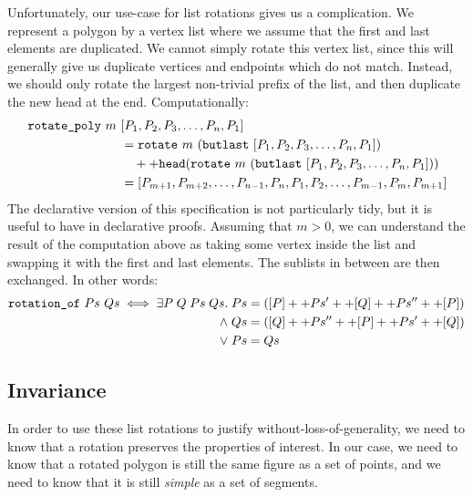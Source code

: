 Unfortunately, our use-case for list rotations gives us a complication. We represent a polygon by a vertex list where we assume that the first and last elements are duplicated. We cannot simply rotate this vertex list, since  this will generally give us duplicate vertices and endpoints which do not match. Instead, we should only rotate the largest non-trivial prefix of the list, and then duplicate the new head at the end. Computationally:
\begin{displaymath}
  \begin{aligned}
    \code{rotate\_poly}\ m\ &[P_1,P_2,P_3,\ldots,P_n,P_1]\\
&= \code{rotate}\ m\ (\code{butlast}\ [P_1,P_2,P_3,\ldots,P_n,P_1])\\
&\quad++ \code{head}(\code{rotate}\ m\ (\code{butlast}\ [P_1,P_2,P_3,\ldots,P_n,P_1]))\\
&= [P_{m+1},P_{m+2},\ldots,P_{n-1},P_n,P_1,P_2,\ldots,P_{m-1},P_m,P_{m+1}]\\
  \end{aligned}
\end{displaymath}
The declarative version of this specification is not particularly tidy, but it is useful to have in declarative proofs. Assuming that $m > 0$, we can understand the result of the computation above as taking some vertex inside the list and swapping it with the first and last elements. The sublists in between are then exchanged. In other words:
\begin{displaymath}
  \begin{aligned}
    \texttt{rotation\_of}\ Ps\ Qs \iff 
    \exists P\; Q\; Ps\; Qs.\; Ps &= ([P] ++ Ps' ++ [Q] ++ Ps'' ++ [P])\\
    \wedge\; Qs &= ([Q] ++ Ps'' ++ [P] ++ Ps' ++ [Q])\\
    \vee\; Ps &= Qs
  \end{aligned}
\end{displaymath}

\subsection{Invariance}
In order to use these list rotations to justify without-loss-of-generality, we need to know that a rotation preserves the properties of interest. In our case, we need to know that a rotated polygon is still the same figure as a set of points, and we need to know that it is still \emph{simple} as a set of segments. 

